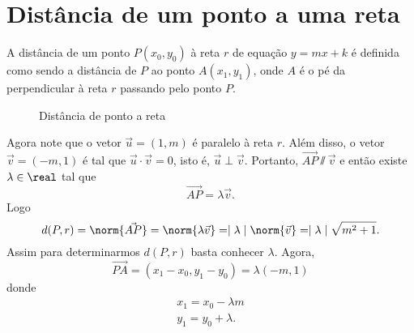 \section{Dist\^ancia de um ponto a uma reta} %
\label{sec:distancia_de_um_ponto_a_uma_reta}
A dist\^ancia de um ponto $P(x_0,y_0)$ \`a reta $r$ de equa\c{c}\~ao $y = mx + k$ \'e definida como sendo a dist\^ancia de $P$ ao ponto $A(x_1, y_1)$, onde $A$ \'e o p\'e da perpendicular \`a reta $r$ passando pelo ponto $P$.
\begin{figure}[!h]
  \centering
  \caption{Distância de ponto a reta}
\end{figure}
Agora note que o vetor $\vec{u} = (1,m)$ \'e paralelo \`a reta $r$. Al\'em disso, o vetor $\vec{v} = (-m, 1)$ \'e tal que $\vec{u}\cdot\vec{v} = 0$, isto \'e, $\vec{u}\perp\vec{v}$. Portanto, $\vec{AP}\varparallel\vec{v}$ e ent\~ao existe $\lambda \in \real$ tal que
\[
  \vec{AP} = \lambda\vec{v}.
\]
Logo
\begin{equation}\label{distancia_ponto_reta_plano}
  d(P,r) = \norm{\vec{AP}} = \norm{\lambda\vec{v}} = \mid\lambda\mid \norm{\vec{v}} = \mid\lambda\mid\sqrt{m^2 + 1}.
\end{equation}
Assim para determinarmos $d(P,r)$ basta conhecer $\lambda$. Agora,
\[
  \vec{PA} = (x_1 - x_0, y_1 - y_0) = \lambda(-m, 1)
\]
donde
\begin{align*}
  x_1 = x_0 - \lambda m\\
  y_1 = y_0 + \lambda.
\end{align*}
